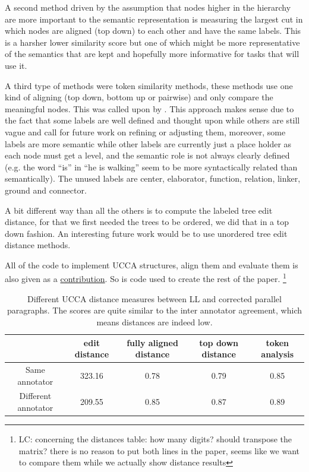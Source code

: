 \documentclass[english]{article}
\newcommand{\lc}[1]{\footnote{\color{green}LC: #1}}
\begin{document}
A second method driven by the assumption that nodes higher in the
hierarchy are more important to the semantic representation is measuring
the largest cut in which nodes are aligned (top down) to each other
and have the same labels. This is a harsher lower similarity
score but one of which might be more representative of the semantics
that are kept and hopefully more informative for tasks that will use it.

A third type of methods were token similarity methods, these methods
use one kind of aligning (top down, bottom up or pairwise) and only
compare the meaningful nodes. This was called upon by \cite{sulem2015conceptual}. 
This approach makes sense due to the fact that some labels
are well defined and thought upon while others are still vague and
call for future work on refining or adjusting them, moreover, some
labels are more semantic while other labels are currently just a place
holder as each node must get a level, and the semantic role is not
always clearly defined (e.g. the word ``is'' in ``he is walking''
seem to be more syntactically related than semantically). The unused
labels are center, elaborator, function, relation, linker, ground
and connector.

A bit different way than all the others is to compute the labeled
tree edit distance\cite{zhang1989simple}, for that we first needed
the trees to be ordered, we did that in a top down fashion. An interesting
future work would be to use unordered tree edit distance methods\cite{zhang1992editing}.

All of the code to implement UCCA structures, align them and evaluate
them is also given as a \href{https://github.com/borgr/assess_learner_language}{contribution}.
So is code used to create the rest of the paper.
\lc{concerning the distances table: how many digits? should transpose the matrix? there is no reason to put both lines in the paper, seems like we want to compare them while we actually show distance results}

\begin{table}[h!]
	\centering
	\label{tab:Distances}
	\begin{tabular}{c|c|c|c|c}
		& edit distance & fully aligned distance & top down distance & token analysis
		\\
		\hline
		Same annotator & 323.16 & 0.78 & 0.79 & 0.85
		\\
		Different annotator & 209.55 & 0.85 & 0.87 & 0.89
		\\
		\end{tabular}
		\caption{Different UCCA distance measures between LL and corrected parallel paragraphs. The scores are quite similar to the inter annotator agreement, which means distances are indeed low.}
	\end{table}
		
\end{document}
